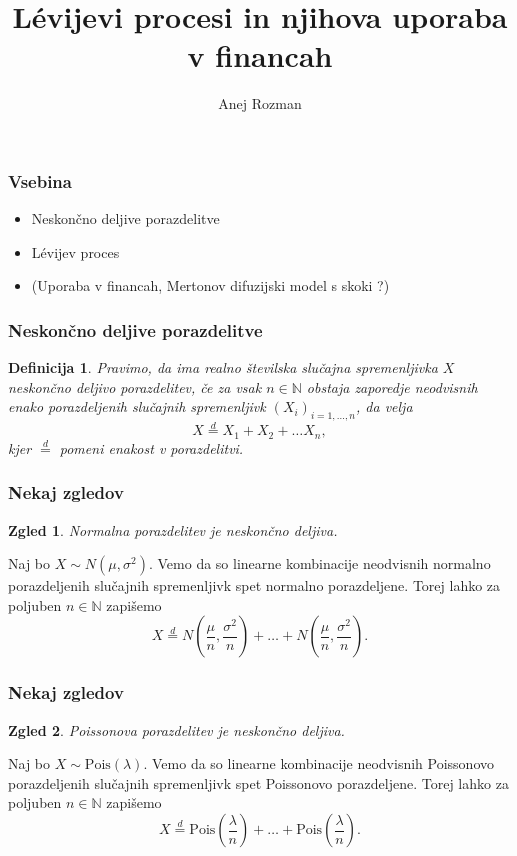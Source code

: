 \documentclass[]{beamer} %
\title{Lévijevi procesi in njihova uporaba v financah}
\subtitle{}
\author[Anej Rozman]{Anej Rozman}
\institute[]{Mentor: doc.~dr. Martin Raič}
\date[]{}
\theoremstyle{plain}
\newtheorem{definicija}{Definicija}
\newtheorem{zgled}{Zgled}
\begin{document}
\frame{\titlepage}

\begin{frame}
  \frametitle{Vsebina}
  \begin{itemize}
    \item <1-> Neskončno deljive porazdelitve
    \item <2-> Lévijev proces
    \item <3-> (Uporaba v financah, Mertonov difuzijski model s skoki ?)
  \end{itemize}
\end{frame}


\begin{frame}
  \frametitle{Neskončno deljive porazdelitve}
  \begin{definicija}
    Pravimo, da ima realno številska slučajna spremenljivka $X$ \textit{neskončno deljivo porazdelitev}, če
    za vsak $n \in \mathbb{N}$ obstaja zaporedje neodvisnih enako porazdeljenih 
    slučajnih spremenljivk $\left(X_i\right)_{i=1,\dots,n}$, da velja
    $$
    X \stackrel{d}{=} X_1 + X_2 + \dots X_n,
    $$
    kjer $\stackrel{d}{=}$ pomeni enakost v porazdelitvi.
\end{definicija}


  \end{frame}


\begin{frame}
  \frametitle{Nekaj zgledov}
  \begin{zgled}
    Normalna porazdelitev je neskončno deljiva.
  \end{zgled}
  \begin{center}
    Naj bo $X \sim N(\mu, \sigma^2)$. Vemo da so linearne kombinacije neodvisnih normalno 
    porazdeljenih slučajnih spremenljivk spet normalno porazdeljene. Torej lahko za poljuben 
    $n\in\mathbb{N}$ zapišemo
    $$
      X \stackrel{d}{=} N(\frac{\mu}{n}, \frac{\sigma^2}{n}) + \dots + N(\frac{\mu}{n}, \frac{\sigma^2}{n}).
    $$
  \end{center}
\end{frame}


\begin{frame}
  \frametitle{Nekaj zgledov}
  \begin{zgled}
    Poissonova porazdelitev je neskončno deljiva.
  \end{zgled}
  \begin{center}
    Naj bo $X \sim \text{Pois}(\lambda)$. Vemo da so linearne kombinacije neodvisnih Poissonovo
    porazdeljenih slučajnih spremenljivk spet Poissonovo porazdeljene. Torej lahko za poljuben 
    $n\in\mathbb{N}$ zapišemo
    $$
      X \stackrel{d}{=} \text{Pois}(\frac{\lambda}{n}) + \dots + \text{Pois}(\frac{\lambda}{n}).
    $$
  \end{center}
\end{frame}
\end{document}
